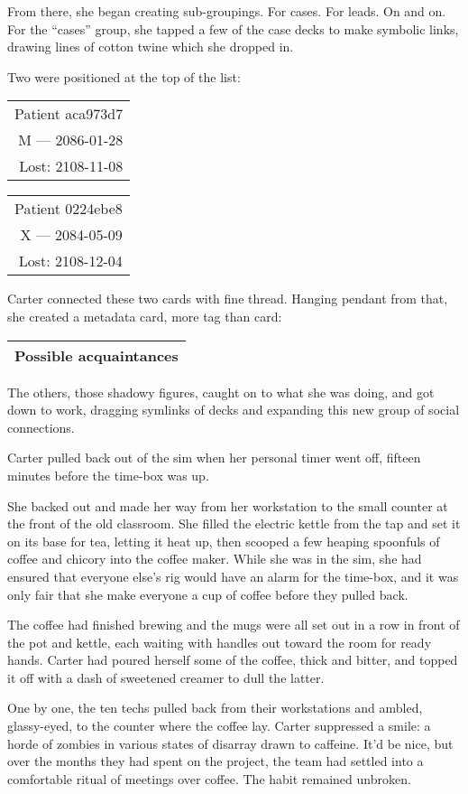 From there, she began creating sub-groupings. For cases. For leads. On and on. For the ``cases'' group, she tapped a few of the case decks to make symbolic links, drawing lines of cotton twine which she dropped in.

Two were positioned at the top of the list:

\begin{longtable}[]{@{}r@{}}
\toprule
\endhead
Patient aca973d7\tabularnewline
M --- 2086-01-28\tabularnewline
Lost: 2108-11-08\tabularnewline
\bottomrule
\end{longtable}

\begin{longtable}[]{@{}r@{}}
\toprule
\endhead
Patient 0224ebe8\tabularnewline
X --- 2084-05-09\tabularnewline
Lost: 2108-12-04\tabularnewline
\bottomrule
\end{longtable}

Carter connected these two cards with fine thread. Hanging pendant from that, she created a metadata card, more tag than card:

\begin{longtable}[]{@{}l@{}}
\toprule
\endhead
Possible acquaintances\tabularnewline
\bottomrule
\end{longtable}

The others, those shadowy figures, caught on to what she was doing, and got down to work, dragging symlinks of decks and expanding this new group of social connections.

Carter pulled back out of the sim when her personal timer went off, fifteen minutes before the time-box was up.

She backed out and made her way from her workstation to the small counter at the front of the old classroom. She filled the electric kettle from the tap and set it on its base for tea, letting it heat up, then scooped a few heaping spoonfuls of coffee and chicory into the coffee maker. While she was in the sim, she had ensured that everyone else's rig would have an alarm for the time-box, and it was only fair that she make everyone a cup of coffee before they pulled back.

The coffee had finished brewing and the mugs were all set out in a row in front of the pot and kettle, each waiting with handles out toward the room for ready hands. Carter had poured herself some of the coffee, thick and bitter, and topped it off with a dash of sweetened creamer to dull the latter.

One by one, the ten techs pulled back from their workstations and ambled, glassy-eyed, to the counter where the coffee lay. Carter suppressed a smile: a horde of zombies in various states of disarray drawn to caffeine. It'd be nice, but over the months they had spent on the project, the team had settled into a comfortable ritual of meetings over coffee. The habit remained unbroken.

